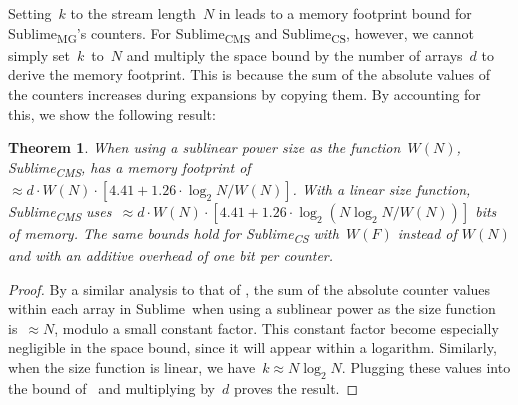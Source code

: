 \documentclass[sigconf]{acmart}
\newtheorem{theorem}{Theorem}[section]
\newcommand{\sketch}{Sublime}
\newcommand{\sketchcms}{\sketch\textsubscript{CMS}\xspace}
\newcommand{\sketchcs}{\sketch\textsubscript{CS}\xspace}
\newcommand{\sketchmg}{\sketch\textsubscript{MG}\xspace}
\begin{document}
Setting~$k$ to the stream length~$N$ in  leads to a memory footprint bound for \sketchmg's counters.
For \sketchcms and \sketchcs, however, we cannot simply set~$k$~to~$N$ and multiply the space bound by the number of arrays~$d$ to derive the memory footprint.
This is because the sum of the absolute values of the counters increases during expansions by copying them.
By accounting for this, we show the following result:
\begin{theorem}
    \label{thm:all_counters_space}
    When using a sublinear power size as the function~$W(N)$, \sketchcms, has a
    memory footprint of~$\approx d \cdot W(N) \cdot \left[ 4.41 + 1.26 \cdot
    \log_2 N/W(N) \right]$. With a linear size function, \sketchcms
    uses~$\approx d \cdot W(N) \cdot \left[4.41 + 1.26 \cdot \log_2(N \log_2
    N/W(N)) \right]$ bits of memory. The same bounds hold for \sketchcs
    with~$W(F)$ instead of $W(N)$ and with an additive overhead of one bit per
    counter.
\end{theorem}
\begin{proof}
    By a similar analysis to that of , the sum of the absolute counter values within each array in \sketch\ when using a sublinear power as the size function is~$\approx N$, modulo a small constant factor.
    This constant factor become especially negligible in the space bound, since it will appear within a logarithm.
    Similarly, when the size function is linear, we have~$k \approx N \log_2 N$.
    Plugging these values into the bound of~ and multiplying by~$d$ proves the result.
\end{proof}
\end{document}

